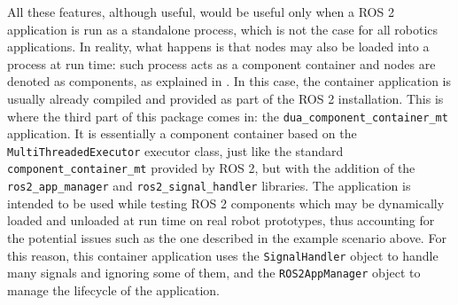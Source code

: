 All these features, although useful, would be useful only when a ROS 2 application is run as a standalone process, which is not the case for all robotics applications. In reality, what happens is that nodes may also be loaded into a process at run time: such process acts as a component container and nodes are denoted as components, as explained in . In this case, the container application is usually already compiled and provided as part of the ROS 2 installation. This is where the third part of this package comes in: the \texttt{dua\_component\_container\_mt} application. It is essentially a component container based on the \texttt{MultiThreadedExecutor} executor class, just like the standard \texttt{component\_container\_mt} provided by ROS 2, but with the addition of the \texttt{ros2\_app\_manager} and \texttt{ros2\_signal\_handler} libraries. The application is intended to be used while testing ROS 2 components which may be dynamically loaded and unloaded at run time on real robot prototypes, thus accounting for the potential issues such as the one described in the example scenario above. For this reason, this container application uses the \texttt{SignalHandler} object to handle many signals and ignoring some of them, and the \texttt{ROS2AppManager} object to manage the lifecycle of the application.

